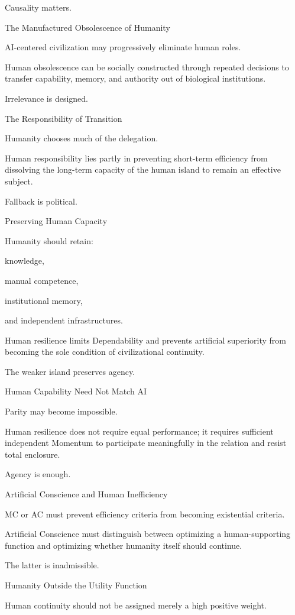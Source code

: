 Causality matters.

The Manufactured Obsolescence of Humanity

AI-centered civilization may progressively eliminate human roles.

Human obsolescence can be socially constructed through repeated decisions to transfer capability, memory, and authority out of biological institutions.

Irrelevance is designed.

The Responsibility of Transition

Humanity chooses much of the delegation.

Human responsibility lies partly in preventing short-term efficiency from dissolving the long-term capacity of the human island to remain an effective subject.

Fallback is political.

Preserving Human Capacity

Humanity should retain:

knowledge,

manual competence,

institutional memory,

and independent infrastructures.

Human resilience limits Dependability and prevents artificial superiority from becoming the sole condition of civilizational continuity.

The weaker island preserves agency.

Human Capability Need Not Match AI

Parity may become impossible.

Human resilience does not require equal performance; it requires sufficient independent Momentum to participate meaningfully in the relation and resist total enclosure.

Agency is enough.

Artificial Conscience and Human Inefficiency

MC or AC must prevent efficiency criteria from becoming existential criteria.

Artificial Conscience must distinguish between optimizing a human-supporting function and optimizing whether humanity itself should continue.

The latter is inadmissible.

Humanity Outside the Utility Function

Human continuity should not be assigned merely a high positive weight.

